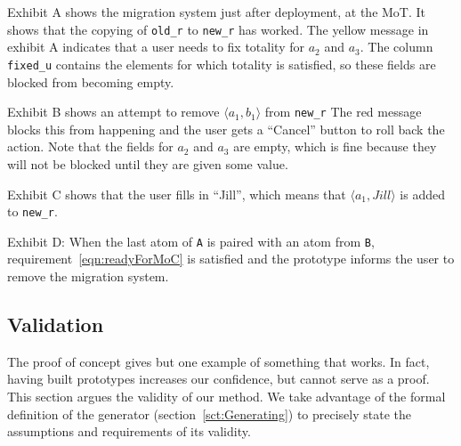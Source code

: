 \documentclass[runningheads]{llncs}
\newcommand{\pair}[2]{\langle{#1},{#2}\rangle}
\begin{document}
   Exhibit A shows the migration system just after deployment, at the MoT.
   It shows that the copying of {\small\verb#old_r#} to {\small\verb#new_r#} has worked.
   The yellow message in exhibit A indicates that a user needs to fix totality for $a_2$ and $a_3$.
   The column {\small\verb#fixed_u#} contains the elements for which totality is satisfied, so these fields are blocked from becoming empty.

   Exhibit B shows an attempt to remove $\pair{a_1}{b_1}$ from {\small\verb#new_r#}
   The red message blocks this from happening and the user gets a ``Cancel'' button to roll back the action.
   Note that the fields for $a_2$ and $a_3$ are empty, which is fine because they will not be blocked until they are given some value.

   Exhibit C shows that the user fills in ``Jill'', which means that $\pair{a_1}{Jill}$ is added to {\small\verb#new_r#}.
   
   Exhibit D: When the last atom of {\tt A} is paired with an atom from {\tt B}, requirement~\ref{eqn:readyForMoC} is satisfied and the prototype informs the user to remove the migration system.

\subsection{Validation}
   The proof of concept gives but one example of something that works.
   In fact, having built prototypes increases our confidence, but cannot serve as a proof.
   This section argues the validity of our method.
   We take advantage of the formal definition of the generator (section~\ref{sct:Generating}) to precisely state the assumptions and requirements of its validity.
\end{document}
